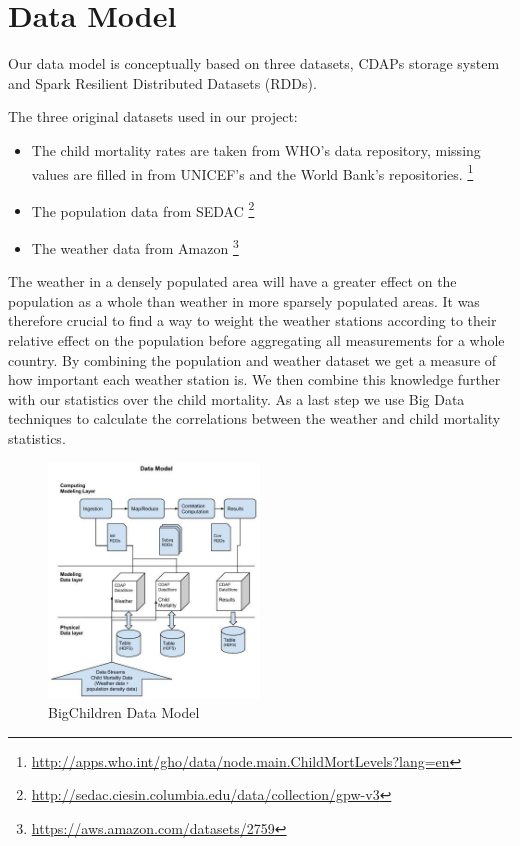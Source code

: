 \documentclass[
10pt, %
a4paper, %
oneside, %
headinclude,footinclude, %
useAMS,
usenatbib
]{template/mn2e}  %
\begin{document}
\section{Data Model}
Our data model is conceptually based on three datasets, CDAPs storage system and Spark Resilient Distributed Datasets (RDDs).

The three original datasets used in our project:
\begin{itemize}
\item The child mortality rates are taken from WHO's data repository, missing values are filled in from UNICEF's and the World Bank's repositories.
  \footnote{\url{http://apps.who.int/gho/data/node.main.ChildMortLevels?lang=en}}
\item The population data from SEDAC
    \footnote{\url{http://sedac.ciesin.columbia.edu/data/collection/gpw-v3}}
\item The weather data from Amazon
    \footnote{\url{https://aws.amazon.com/datasets/2759}}
\end{itemize}

The weather in a densely populated area will have a greater effect on the population as a whole than weather in more sparsely populated areas. It was therefore crucial to find a way to weight the weather stations according to their relative effect on the population before aggregating all measurements for a whole country. By combining the population and weather dataset we get a measure of how important each weather station is. We then combine this knowledge further with our statistics over the child mortality. As a last step we use Big Data techniques to calculate the correlations between the weather and child mortality statistics.

\begin{figure}
    \includegraphics[width=0.5\textwidth]{src/BigChild_DataModel}
    \caption{BigChildren Data Model}
    \label{fig:Data Model}
\end{figure}
\end{document}
